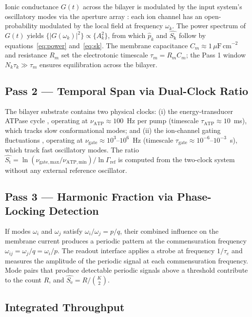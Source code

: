 \documentclass[11pt,twocolumn,a4paper]{article}
\theoremstyle{definition}
\theoremstyle{remark}
\newcommand{\Sk}{S_{\mathrm{k}}}
\newcommand{\St}{S_{\mathrm{t}}}
\newcommand{\Se}{S_{\mathrm{e}}}
\begin{document}
Ionic conductance $G(t)$ across the bilayer is modulated by the input system's
oscillatory modes via the aperture array \citep{companion3}: each ion channel
has an open-probability modulated by the local field at frequency $\omega_k$.
The power spectrum of $G(t)$ yields $\{|G(\omega_k)|^2\} \propto \{A_k^2\}$,
from which $\hat{p}_k$ and $\hat{\Sk}$ follow by equations~\eqref{eq:power}
and~\eqref{eq:sk}. The membrane capacitance $C_m \approx 1\,\mu\mathrm{F\,cm}^{-2}$
and resistance $R_m$ set the electrotonic timescale $\tau_m = R_m C_m$; the
Pass 1 window $N_k \tau_k \gg \tau_m$ ensures equilibration across the bilayer.

\subsection{Pass 2 --- Temporal Span via Dual-Clock Ratio}

The bilayer substrate contains two physical clocks:
(i) the energy-transducer ATPase cycle \citep{companion4}, operating at
$\nu_{\mathrm{ATP}} \approx 100$~Hz per pump (timescale $\tau_{\mathrm{ATP}}
\approx 10$~ms), which tracks slow conformational modes; and
(ii) the ion-channel gating fluctuations \citep{hille2001}, operating at
$\nu_{\mathrm{gate}} \approx 10^3$--$10^6$~Hz (timescale $\tau_{\mathrm{gate}}
\approx 10^{-6}$--$10^{-3}$~s), which track fast oscillatory modes.
The ratio $\hat{\St} = \ln(\nu_{\mathrm{gate,max}} / \nu_{\mathrm{ATP,min}}) /
\ln\Gamma_{\mathrm{ref}}$ is computed from the two-clock system without
any external reference oscillator.

\subsection{Pass 3 --- Harmonic Fraction via Phase-Locking Detection}

If modes $\omega_i$ and $\omega_j$ satisfy $\omega_i/\omega_j = p/q$, their
combined influence on the membrane current produces a periodic pattern at
the commensuration frequency $\omega_{ij} = \omega_j / q = \omega_i / p$.
The readout interface \citep{companion6} applies a strobe at frequency
$1/\tau_e$ and measures the amplitude of the periodic signal at each
commensuration frequency. Mode pairs that produce detectable periodic signals
above a threshold contribute to the count $R$, and $\hat{\Se} = R / \binom{K}{2}$.

\subsection{Integrated Throughput}
\end{document}
